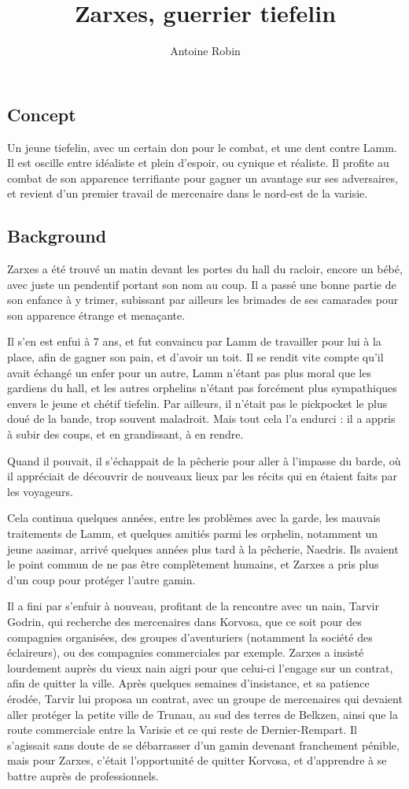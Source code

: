 \documentclass[10pt,a4paper]{book}
\author{ Antoine Robin}
\title{Zarxes, guerrier tiefelin}
\begin{document}
\maketitle
\subsection{Concept}
Un jeune tiefelin, avec un certain don pour le combat, et une dent contre Lamm. Il est oscille entre idéaliste et plein d'espoir, ou cynique et réaliste. Il profite au combat de son apparence terrifiante pour gagner un avantage sur ses adversaires, et revient d'un premier travail de mercenaire dans le nord-est de la varisie.

\subsection{Background}
Zarxes a été trouvé un matin devant les portes du hall du racloir, encore un bébé, avec juste un pendentif portant son nom au coup. Il a passé une bonne partie de son enfance à y trimer, subissant par ailleurs les brimades de ses camarades pour son apparence étrange et menaçante.

Il s'en est enfui à 7 ans, et fut convaincu par Lamm de travailler pour lui à la place, afin de gagner son pain, et d'avoir un toit. Il se rendit vite compte qu'il avait échangé un enfer pour un autre, Lamm n'étant pas plus moral que les gardiens du hall, et les autres orphelins n'étant pas forcément plus sympathiques envers le jeune et chétif tiefelin. Par ailleurs, il n'était pas le pickpocket le plus doué de la bande, trop souvent maladroit. Mais tout cela l'a endurci : il a appris à subir des coups, et en grandissant, à en rendre.

Quand il pouvait, il s'échappait de la pêcherie pour aller à l'impasse du barde, où il appréciait de découvrir de nouveaux lieux par les récits qui en étaient faits par les voyageurs.

Cela continua quelques années, entre les problèmes avec la garde, les mauvais traitements de Lamm, et quelques amitiés parmi les orphelin, notamment un jeune aasimar, arrivé quelques années plus tard à la pêcherie, Naedris. Ils avaient le point commun de ne pas être complètement humains, et Zarxes a pris plus d'un coup pour protéger l'autre gamin.

Il a fini par s'enfuir à nouveau, profitant de la rencontre avec un nain, Tarvir Godrin, qui recherche des mercenaires dans Korvosa, que ce soit pour des compagnies organisées, des groupes d'aventuriers (notamment la société des éclaireurs), ou des compagnies commerciales par exemple. Zarxes a insisté lourdement auprès du vieux nain aigri pour que celui-ci l'engage sur un contrat, afin de quitter la ville. Après quelques semaines d'insistance, et sa patience érodée, Tarvir lui proposa un contrat, avec un groupe de mercenaires qui devaient aller protéger la petite ville de Trunau, au sud des terres de Belkzen, ainsi que la route commerciale entre la Varisie et ce qui reste de Dernier-Rempart. Il s'agissait sans doute de se débarrasser d'un gamin devenant franchement pénible, mais pour Zarxes, c'était l'opportunité de quitter Korvosa, et d'apprendre à se battre auprès de professionnels.
\end{document}
